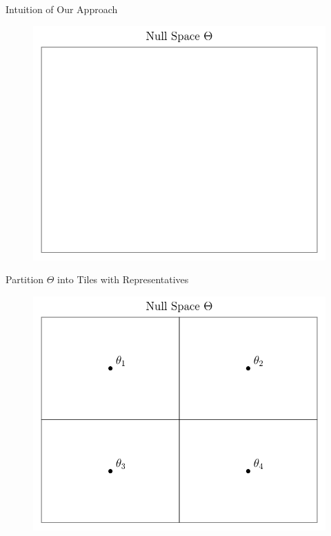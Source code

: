 \begin{frame}{Intuition of Our Approach}
\begin{figure}
    \centering
    \includegraphics[width=0.95\linewidth]{figs/approach_1.pdf}
\end{figure} 
\end{frame}

\begin{frame}{Partition $\Theta$ into Tiles with Representatives}
\begin{figure}
    \centering
    \includegraphics[width=0.95\linewidth]{figs/approach_2.pdf}
\end{figure} 
\end{frame}

